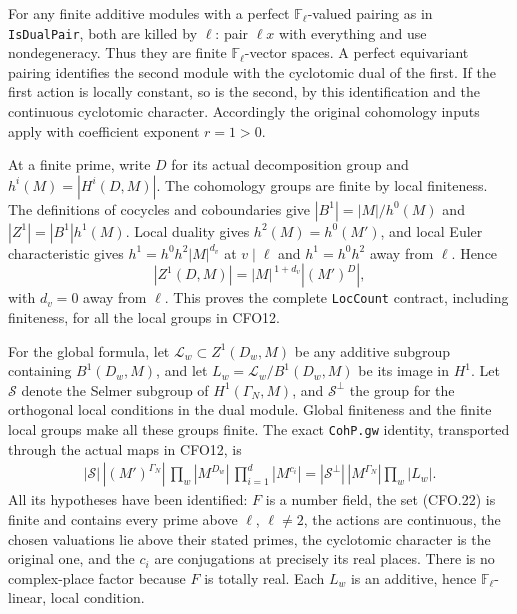 For any finite additive modules with a perfect
$\mathbb F_\ell$-valued pairing as in \texttt{IsDualPair},
both are killed by $\ell$: pair $\ell x$ with everything
and use nondegeneracy.  Thus they are finite
$\mathbb F_\ell$-vector spaces.  A perfect equivariant
pairing identifies the second module with the cyclotomic
dual of the first.  If the first action is locally
constant, so is the second, by this identification and
the continuous cyclotomic character.  Accordingly the
original cohomology inputs apply with coefficient
exponent $r=1>0$.

At a finite prime, write $D$ for its actual decomposition
group and $h^i(M)=|H^i(D,M)|$.  The cohomology groups are
finite by local finiteness.  The definitions of cocycles
and coboundaries give
$|B^1|=|M|/h^0(M)$ and
$|Z^1|=|B^1|h^1(M)$.  Local duality gives
$h^2(M)=h^0(M')$, and local Euler characteristic gives
$h^1=h^0h^2|M|^{d_v}$ at $v\mid\ell$ and $h^1=h^0h^2$
away from $\ell$.  Hence
\[
 |Z^1(D,M)|=|M|^{\,1+d_v}|(M')^D|,                              \tag{CFO.23}
\]
with $d_v=0$ away from $\ell$.  This proves the complete
\texttt{LocCount} contract, including finiteness, for
all the local groups in CFO12.

For the global formula, let $\mathcal L_w\subset Z^1(D_w,M)$
be any additive subgroup containing $B^1(D_w,M)$, and let
$L_w=\mathcal L_w/B^1(D_w,M)$ be its image in $H^1$.
Let $\mathscr S$ denote the Selmer subgroup of $H^1(\Gamma_N,M)$,
and $\mathscr S^\perp$ the group for the orthogonal local
conditions in the dual module.  Global finiteness and
the finite local groups make all these groups finite.
The exact \texttt{CohP.gw} identity, transported through
the actual maps in CFO12, is
\[
 \begin{split}
 |\mathscr S|\,|(M')^{\Gamma_N}|\,
  \prod_w |M^{D_w}|\,\prod_{i=1}^{d}|M^{c_i}|
 =|\mathscr S^\perp|\,|M^{\Gamma_N}|\prod_w|L_w|.
 \end{split}                                                     \tag{CFO.24}
\]
All its hypotheses have been identified: $F$ is a number
field, the set (CFO.22) is finite and contains every
prime above $\ell$, $\ell\ne2$, the actions are continuous,
the chosen valuations lie above their stated primes,
the cyclotomic character is the original one, and the
$c_i$ are conjugations at precisely its real places.
There is no complex-place factor because $F$ is totally real.
Each $L_w$ is an additive, hence $\mathbb F_\ell$-linear,
local condition.


